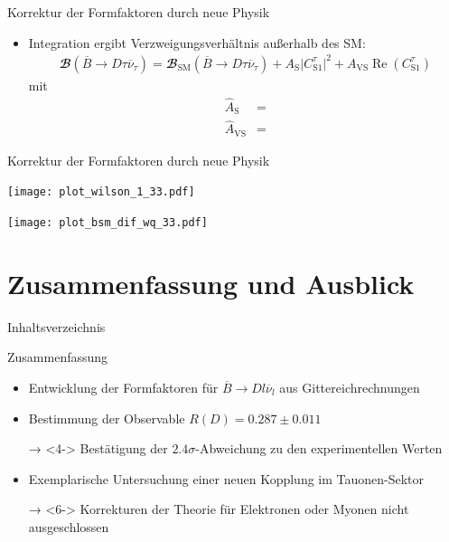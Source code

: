 \documentclass[fleqn, aspectratio=1610, professionalfonts, 9pt]{beamer}
\begin{document}
\begin{frame}{Korrektur der Formfaktoren durch neue Physik}
  \begin{itemize}
    \setlength\itemsep{1em}
    \item<1-> Integration ergibt Verzweigungsverhältnis außerhalb des SM:
    \begin{align*}
        {\mathbfcal{B}}\!\left(\overline{B} \to D \tau \overline{\nu}_\tau \right) = {\mathbfcal{B}}_\text{SM}\!\left(\overline{B} \to D \tau \overline{\nu}_\tau \right) + A_\text{S} \lvert C_{\text{S}1}^{\tau} \rvert^2 + A_{\text{VS}} \operatorname{Re}(C_{\text{S}1}^{\tau})
    \end{align*}
    mit
    \begin{align*}
      \hat{A}_\text{S} &=  \\
      \hat{A}_{\text{VS}} &= 
    \end{align*}
  \end{itemize}
\end{frame}


\begin{frame}{Korrektur der Formfaktoren durch neue Physik}
  \begin{minipage}{7.4cm}
      \texttt{[image: plot\_wilson\_1\_33.pdf]}
  \end{minipage}
  \begin{minipage}{7.4cm}
      \texttt{[image: plot\_bsm\_dif\_wq\_33.pdf]}
  \end{minipage}%
\end{frame}


\section{Zusammenfassung und Ausblick}

\begin{frame}{Inhaltsverzeichnis}
  \tableofcontents[currentsection,currentsubsection,
      hideothersubsections,
      sectionstyle=show/shaded,
  ]\end{frame}

\begin{frame}{Zusammenfassung}
  \begin{itemize}
    \setlength\itemsep{1em}
    \item<2-> Entwicklung der Formfaktoren für $\overline{B} \to D l \overline{\nu}_l$ aus Gittereichrechnungen
    \item<3-> Bestimmung der Observable $R(D) = \num{0.287} \pm \num{0.011}$
    \item[→]<4-> Bestätigung der $\num{2.4}\sigma$-Abweichung zu den experimentellen Werten
    \item<5-> Exemplarische Untersuchung einer neuen Kopplung im Tauonen-Sektor
    \item[→]<6-> Korrekturen der Theorie für Elektronen oder Myonen nicht ausgeschlossen
  \end{itemize}
\end{frame}
\end{document}
